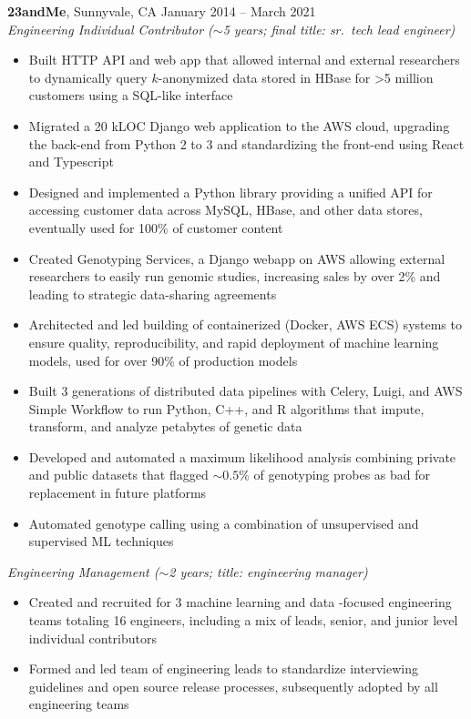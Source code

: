 \documentclass[margin,line]{resume}
\begin{document}
\begin{resume}
    \textbf{23andMe}, Sunnyvale, CA \hfill\vspace{1mm}\hfill January 2014 -- March 2021\\%
    \textsl{Engineering Individual Contributor (\(\sim\)5 years; final title: sr.\ tech lead engineer)}
    \begin{itemize}
    \item Built HTTP API and web app that allowed internal and external researchers to dynamically query \(k\)-anonymized data stored in HBase for \textgreater 5 million customers using a SQL-like interface
    \item Migrated a 20 kLOC Django web application to the AWS cloud, upgrading the back-end from Python 2 to 3 and standardizing the front-end using React and Typescript
    \item Designed and implemented a Python library providing a unified API for accessing customer data across MySQL, HBase, and other data stores, eventually used for 100\% of customer content
    \item Created Genotyping Services, a Django webapp on AWS allowing external researchers to easily run genomic studies, increasing sales by over 2\% and leading to strategic data-sharing agreements
    \item Architected and led building of containerized (Docker, AWS ECS) systems to ensure quality, reproducibility, and rapid deployment of machine learning models, used for over 90\% of production models
    \item Built 3 generations of distributed data pipelines with Celery, Luigi, and AWS Simple Workflow to run Python, C++, and R algorithms that impute, transform, and analyze petabytes of genetic data
    \item Developed and automated a maximum likelihood analysis combining private and public datasets that flagged \(\sim0.5\%\) of genotyping probes as bad for replacement in future platforms
    \item Automated genotype calling using a combination of unsupervised and supervised ML techniques
    \end{itemize}
    \textsl{Engineering Management (\(\sim\)2 years; title: engineering manager)}
    \begin{itemize}
    \item Created and recruited for 3 machine learning and data -focused engineering teams totaling 16 engineers, including a mix of leads, senior, and junior level individual contributors
    \item Formed and led team of engineering leads to standardize interviewing guidelines and open source release processes, subsequently adopted by all engineering teams
    \end{itemize}
    

\end{resume}
\end{document}
